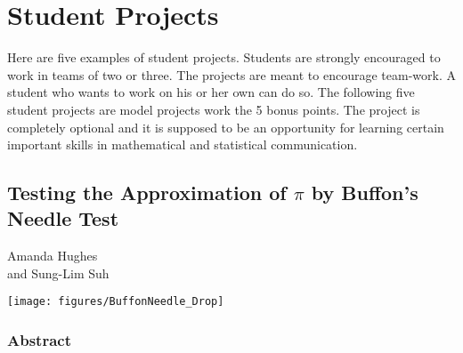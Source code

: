 \chapter{Student Projects}\label{S:StudentProjects2007}
%
Here are five examples of student projects. 
Students are strongly encouraged to work in teams of two or three. 
The projects are meant to encourage team-work. 
A student who wants to work on his or her own can do so. 
The following five student projects are model projects work the 5 bonus points. 
The project is completely optional and it is supposed to be an opportunity for learning certain important skills in mathematical and statistical communication. 


\section{Testing the Approximation of $\pi$ by Buffon's Needle Test}
\begin{center}
Amanda Hughes \\and Sung-Lim Suh
\end{center}


\begin{center}
\texttt{[image: figures/BuffonNeedle\_Drop]}
\end{center}


\subsection*{Abstract}

